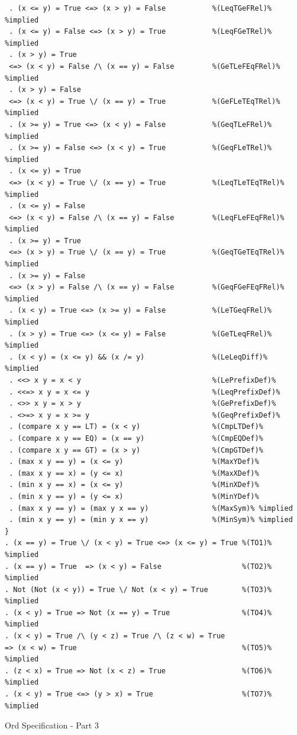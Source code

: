 \documentclass[12pt,twoside]{article}
\numberwithin{spec}{subsection}
\numberwithin{proof}{subsection}
\numberwithin{figure}{subsection}
\numberwithin{code}{subsection}
\begin{document}
\addtocounter{spec}{-1}
\begin{spec}
\begin{verbatim}
 . (x <= y) = True <=> (x > y) = False           %(LeqTGeFRel)% %implied
 . (x <= y) = False <=> (x > y) = True           %(LeqFGeTRel)% %implied
 . (x > y) = True 
 <=> (x < y) = False /\ (x == y) = False         %(GeTLeFEqFRel)% %implied
 . (x > y) = False 
 <=> (x < y) = True \/ (x == y) = True           %(GeFLeTEqTRel)% %implied
 . (x >= y) = True <=> (x < y) = False           %(GeqTLeFRel)% %implied
 . (x >= y) = False <=> (x < y) = True           %(GeqFLeTRel)% %implied
 . (x <= y) = True 
 <=> (x < y) = True \/ (x == y) = True           %(LeqTLeTEqTRel)% %implied
 . (x <= y) = False 
 <=> (x < y) = False /\ (x == y) = False         %(LeqFLeFEqFRel)% %implied
 . (x >= y) = True 
 <=> (x > y) = True \/ (x == y) = True           %(GeqTGeTEqTRel)% %implied
 . (x >= y) = False 
 <=> (x > y) = False /\ (x == y) = False         %(GeqFGeFEqFRel)% %implied
 . (x < y) = True <=> (x >= y) = False           %(LeTGeqFRel)% %implied
 . (x > y) = True <=> (x <= y) = False           %(GeTLeqFRel)% %implied
 . (x < y) = (x <= y) && (x /= y)                %(LeLeqDiff)% %implied
 . <<> x y = x < y                               %(LePrefixDef)%
 . <<=> x y = x <= y                             %(LeqPrefixDef)%
 . <>> x y = x > y                               %(GePrefixDef)%
 . <>=> x y = x >= y                             %(GeqPrefixDef)%
 . (compare x y == LT) = (x < y)                 %(CmpLTDef)%
 . (compare x y == EQ) = (x == y)                %(CmpEQDef)%
 . (compare x y == GT) = (x > y)                 %(CmpGTDef)%
 . (max x y == y) = (x <= y)                     %(MaxYDef)%
 . (max x y == x) = (y <= x)                     %(MaxXDef)%
 . (min x y == x) = (x <= y)                     %(MinXDef)%
 . (min x y == y) = (y <= x)                     %(MinYDef)%
 . (max x y == y) = (max y x == y)               %(MaxSym)% %implied
 . (min x y == y) = (min y x == y)               %(MinSym)% %implied
}
. (x == y) = True \/ (x < y) = True <=> (x <= y) = True %(TO1)% %implied
. (x == y) = True  => (x < y) = False                   %(TO2)% %implied
. Not (Not (x < y)) = True \/ Not (x < y) = True        %(TO3)% %implied
. (x < y) = True => Not (x == y) = True                 %(TO4)% %implied
. (x < y) = True /\ (y < z) = True /\ (z < w) = True 
=> (x < w) = True                                       %(TO5)% %implied
. (z < x) = True => Not (x < z) = True                  %(TO6)% %implied
. (x < y) = True <=> (y > x) = True                     %(TO7)% %implied
\end{verbatim}
\caption{Ord Specification - Part 3}
\end{spec}
\end{document}
